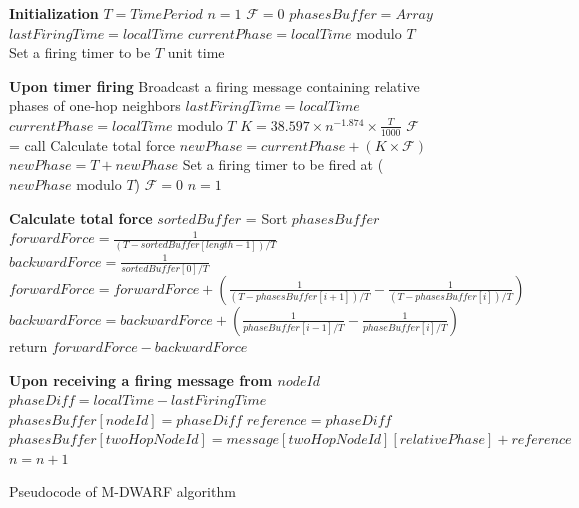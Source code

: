 \begin{figure}[!t]
\begin{algorithmic}[1]
	\STATE \textbf{Initialization}  
  	\STATE $T = TimePeriod$ 
  	\STATE $n = 1$ 
  	\STATE $\mathcal{F} = 0$ 
  	\STATE $phasesBuffer = Array$ 
  	\STATE $lastFiringTime = localTime$
  	\STATE $currentPhase = localTime$ modulo $T$
  	\STATE Set a firing timer to be $T$ unit time
  	\newline
  	
  	\STATE \textbf{Upon timer firing}
    \STATE Broadcast a firing message containing relative phases of one-hop neighbors
    \STATE $lastFiringTime = localTime$
  	\STATE $currentPhase= localTime$ modulo $T$
    \STATE $K = 38.597 \times n^{-1.874} \times \frac{T}{1000}$
    \STATE $\mathcal{F}$ = call Calculate total force
    \STATE $newPhase = currentPhase + (K \times \mathcal{F})$
    	\STATE $newPhase = T + newPhase$
	\ENDIF
    \STATE Set a firing timer to be fired at ($newPhase$ modulo $T$)
   	\STATE $\mathcal{F} = 0$
   	\STATE $n = 1$
 	\newline
 	
 	\STATE \textbf{Calculate total force}
 	\STATE $sortedBuffer$ = Sort $phasesBuffer$
 	\STATE $forwardForce = \frac{1}{(T - sortedBuffer[length - 1])/T}$
 	\STATE $backwardForce = \frac{1}{sortedBuffer[0]/T}$
        \STATE $forwardForce = forwardForce + (\frac{1}{(T - phasesBuffer[i+1]) / T} - \frac{1}{(T - phasesBuffer[i]) / T})$
      \ELSE
        \STATE $backwardForce = backwardForce + (\frac{1}{phaseBuffer[i-1] / T} - \frac{1}{phaseBuffer[i] / T})$
      \ENDIF
    \ENDFOR
    \STATE return $forwardForce - backwardForce$
 	\newline
 	   
    \STATE \textbf{Upon receiving a firing message from $nodeId$}
    \STATE $phaseDiff = localTime - lastFiringTime$
    \STATE $phasesBuffer[nodeId] = phaseDiff$
    \STATE $reference = phaseDiff$
        \STATE $phasesBuffer[twoHopNodeId] = message[twoHopNodeId][relativePhase] + reference$
        \STATE $n = n + 1$
      \ENDIF
    \ENDFOR
\end{algorithmic}
\caption{Pseudocode of M-DWARF algorithm}
\label{fig:pseudocodemdwarf}
\end{figure}


